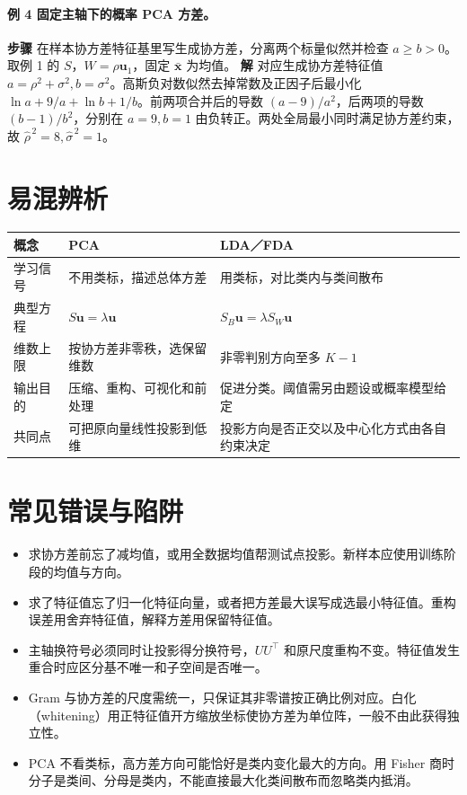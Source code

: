 \documentclass[UTF8,a4paper,zihao=-4,fontset=fandol]{ctexrep}
\begin{document}
\paragraph{例 4 固定主轴下的概率 PCA 方差。}
\textbf{步骤} 在样本协方差特征基里写生成协方差，分离两个标量似然并检查 \(a\ge b>0\)。取例 1 的 \(S\)，\(W=\rho\bm u_1\)，固定 \(\bar{\bm x}\) 为均值。
\textbf{解} 对应生成协方差特征值 \(a=\rho^2+\sigma^2,b=\sigma^2\)。高斯负对数似然去掉常数及正因子后最小化 \(\ln a+9/a+\ln b+1/b\)。前两项合并后的导数 \((a-9)/a^2\)，后两项的导数 \((b-1)/b^2\)，分别在 \(a=9,b=1\) 由负转正。两处全局最小同时满足协方差约束，故 \(\widehat{\rho}^{\,2}=8,\widehat{\sigma}^{\,2}=1\)。

\section{易混辨析}
\noindent\begin{tabularx}{\linewidth}{@{}p{.21\linewidth}XX@{}}
\toprule
概念 & PCA & LDA／FDA\\
\midrule
学习信号 & 不用类标，描述总体方差 & 用类标，对比类内与类间散布\\
典型方程 & \(S\bm u=\lambda\bm u\) & \(S_B\bm u=\lambda S_W\bm u\)\\
维数上限 & 按协方差非零秩，选保留维数 & 非零判别方向至多 \(K-1\)\\
输出目的 & 压缩、重构、可视化和前处理 & 促进分类。阈值需另由题设或概率模型给定\\
共同点 & 可把原向量线性投影到低维 & 投影方向是否正交以及中心化方式由各自约束决定\\
\bottomrule
\end{tabularx}

\section{常见错误与陷阱}
\begin{itemize}[leftmargin=2em]
\item 求协方差前忘了减均值，或用全数据均值帮测试点投影。新样本应使用训练阶段的均值与方向。
\item 求了特征值忘了归一化特征向量，或者把方差最大误写成选最小特征值。重构误差用舍弃特征值，解释方差用保留特征值。
\item 主轴换符号必须同时让投影得分换符号，\(UU^\top\) 和原尺度重构不变。特征值发生重合时应区分基不唯一和子空间是否唯一。
\item Gram 与协方差的尺度需统一，只保证其非零谱按正确比例对应。白化（whitening）用正特征值开方缩放坐标使协方差为单位阵，一般不由此获得独立性。
\item PCA 不看类标，高方差方向可能恰好是类内变化最大的方向。用 Fisher 商时分子是类间、分母是类内，不能直接最大化类间散布而忽略类内抵消。
\end{itemize}
\end{document}
